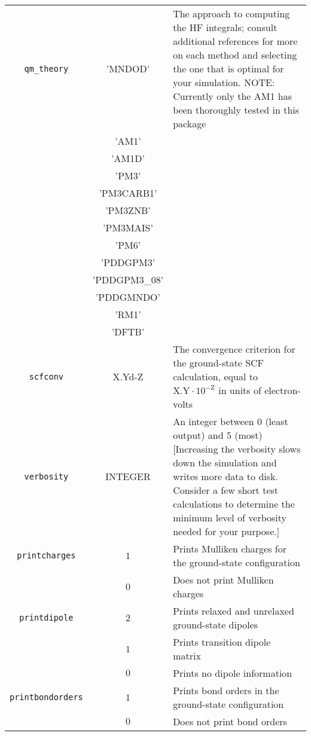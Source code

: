\documentclass[12pt,letter,footinclude=true,headinclude=true,hyphens]{book} %
\begin{document}
    \begin{tabular}{ | c | c | p{7cm} | }
    \hline
    \texttt{qm\_theory} & 'MNDOD' & The approach to computing the HF integrals; consult additional references for more on each method and selecting the one that is optimal for your simulation. NOTE: Currently only the AM1 has been thoroughly tested in this package\\
    & 'AM1' & \\
    & 'AM1D' & \\
    & 'PM3' & \\
    & 'PM3CARB1' & \\
    & 'PM3ZNB' & \\
    & 'PM3MAIS' & \\
    & 'PM6' & \\
    & 'PDDGPM3' & \\
    & 'PDDGPM3\_08' & \\
    & 'PDDGMNDO' & \\
    & 'RM1' & \\
    & 'DFTB' & \\
    \hline
    \texttt{scfconv} & X.Yd-Z & The convergence criterion for the ground-state SCF calculation, equal to $\mathrm{X.Y} \cdot 10^{-\mathrm{Z}}$ in units of electron-volts \\
    \hline
    \texttt{verbosity} & INTEGER & An integer between 0 (least output) and 5 (most) [Increasing the verbosity slows down the simulation and writes more data to disk. Consider a few short test calculations to determine the minimum level of verbosity needed for your purpose.]\\
    \hline
    \texttt{printcharges} & $1$ & Prints Mulliken charges for the ground-state configuration \\
    & $0$ & Does not print Mulliken charges \\
    \hline
    \texttt{printdipole} & $2$ & Prints relaxed and unrelaxed ground-state dipoles \\
    & $1$ & Prints transition dipole matrix \\
    & $0$ & Prints no dipole information \\ \hline
    \texttt{printbondorders} & $1$ & Prints bond orders in the ground-state configuration \\
    & $0$ & Does not print bond orders \\ \hline
    \end{tabular}
    
\end{document}

